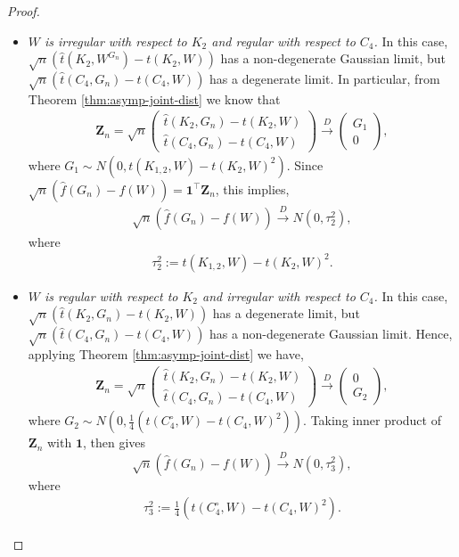 \documentclass[11pt,reqno]{amsart}
\numberwithin{equation}{section}
\newcommand\dto{\overset{D}{\rightarrow}}
\theoremstyle{definition}
\begin{document}
\begin{proof}
\begin{itemize}
\item[{\it Case} 2:] {\it $W$ is irregular with respect to $K_{2}$ and regular with respect to $C_{4}$.} In this case, $\sqrt{n} (\hat{t}(K_{2}, W^{G_{n}}) - t(K_{2}, W))$ has a non-degenerate Gaussian limit, but $\sqrt{n} (\hat{t}(C_{4}, G_n) - t(C_{4},W))$ has a degenerate limit. In particular, from Theorem \ref{thm:asymp-joint-dist} we know that 
\begin{align*}
    \bm Z_n = \sqrt{n}
    \begin{pmatrix}
    \hat{t}(K_{2}, G_n) - t(K_{2},W)\\
    \hat{t}(C_{4}, G_n) - t(C_{4},W)
    \end{pmatrix}
    \overset{D}{\rightarrow}
    \begin{pmatrix}
    G_{1}\\
    0
    \end{pmatrix} , 
\end{align*}
where $G_{1}\sim N(0, t(K_{1, 2},W)-t(K_{2},W)^{2})$. Since $\sqrt{n} (\hat f(G_n) - f(W)) = \bm{1}^\top \bm Z_{n}$, this implies, 
\begin{align*}
    \sqrt{n}( \hat f(G_n) - f(W) )\dto N(0,\tau_2^2) , 
\end{align*}
where 
\begin{align}\label{eq:varianceirregularregular}
    \tau_2^2 := t(K_{1, 2},W)-t(K_{2},W)^{2} . 
\end{align}



\item[{\it Case} 3:] {\it $W$ is regular with respect to $K_{2}$ and irregular with respect to $C_{4}$.} In this case, $\sqrt{n} (\hat{t}(K_{2}, G_n) - t(K_{2},W))$ has a degenerate limit, but $\sqrt{n} (\hat{t}(C_{4}, G_n) - t(C_{4},W))$ has a non-degenerate Gaussian limit. Hence, applying Theorem \ref{thm:asymp-joint-dist} we have,
\begin{align*}
  \bm{Z}_n =  \sqrt{n}
    \begin{pmatrix}
    \hat{t}(K_{2}, G_n) - t(K_{2},W)\\
    \hat{t}(C_{4}, G_n) - t(C_{4},W)
    \end{pmatrix}
    \overset{D}{\rightarrow}
    \begin{pmatrix}
    0\\
    G_{2}
    \end{pmatrix} , 
\end{align*}
where $G_{2}\sim N\left(0, \frac{1}{4}\left(t(C_4^{\circ},W) - t(C_{4},W)^{2}\right)\right)$. Taking inner product of $\bm{Z}_n$ with $\bm 1$, then gives $$\sqrt{n} (\hat f(G_n) - f(W) ) \dto N(0, \tau_3^2),$$ where 
\begin{align}\label{eq:varianceregularirregular}
    \tau_3^2 := \frac{1}{4}\left(t(C_{4}^{\circ},W) - t(C_{4},W)^{2}\right) . 
\end{align}



\end{itemize}
\end{proof}
\end{document}
